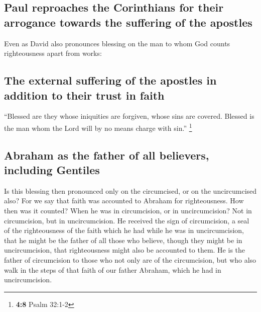 \hypertarget{paul-reproaches-the-corinthians-for-their-arrogance-towards-the-suffering-of-the-apostles}{%
\subsection{Paul reproaches the Corinthians for their arrogance towards
the suffering of the
apostles}\label{paul-reproaches-the-corinthians-for-their-arrogance-towards-the-suffering-of-the-apostles}}

 Even as David also pronounces blessing on the man to whom
God counts righteousness apart from works:

\hypertarget{the-external-suffering-of-the-apostles-in-addition-to-their-trust-in-faith}{%
\subsection{The external suffering of the apostles in addition to their
trust in
faith}\label{the-external-suffering-of-the-apostles-in-addition-to-their-trust-in-faith}}

 ``Blessed are they whose iniquities are forgiven, whose
sins are covered.  Blessed is the man whom the Lord will
by no means charge with sin.'' \footnote{\textbf{4:8} Psalm 32:1-2}

\hypertarget{abraham-as-the-father-of-all-believers-including-gentiles}{%
\subsection{Abraham as the father of all believers, including
Gentiles}\label{abraham-as-the-father-of-all-believers-including-gentiles}}

 Is this blessing then pronounced only on the circumcised,
or on the uncircumcised also? For we say that faith was accounted to
Abraham for righteousness.  How then was it counted? When
he was in circumcision, or in uncircumcision? Not in circumcision, but
in uncircumcision.  He received the sign of circumcision,
a seal of the righteousness of the faith which he had while he was in
uncircumcision, that he might be the father of all those who believe,
though they might be in uncircumcision, that righteousness might also be
accounted to them.  He is the father of circumcision to
those who not only are of the circumcision, but who also walk in the
steps of that faith of our father Abraham, which he had in
uncircumcision.

